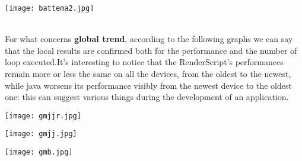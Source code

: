 \documentclass[11pt,english]{article}
\begin{document}
\begin{right}
\texttt{[image: battema2.jpg]}
\end{right}
\\For what concerns \textbf{global trend}, according to the following graphs we can say that the local results are confirmed both for the performance and the number of loop executed.It's interesting to notice that the RenderScript's performances remain more or less the same on all the devices, from the oldest to the newest, while java worsens its performance visibly from the newest device to the oldest one: this can suggest various things during the development of an application. 
\begin{center}
\texttt{[image: gmjjr.jpg]}
\end{center} 
\begin{center}
\texttt{[image: gmjj.jpg]}
\end{center} 
\begin{center}
\texttt{[image: gmb.jpg]}
\end{center} 
\end{document}

